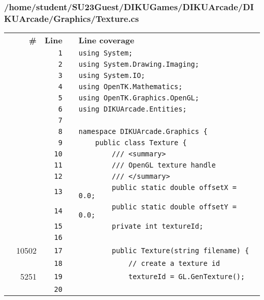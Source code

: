 \documentclass[a4paper,landscape,10pt]{article}
\begin{document}
\subsubsection{/home/student/SU23Guest/DIKUGames/DIKUArcade/DIKUArcade/Graphics/Texture.cs}
\begin{longtable}[l]{lrrll}
\textbf{} & \textbf{\#} & \textbf{Line} & \textbf{} & \textbf{Line coverage}\\
\cellcolor{gray} &  & \verb~1~ & & \verb~using System;~\\
\cellcolor{gray} &  & \verb~2~ & & \verb~using System.Drawing.Imaging;~\\
\cellcolor{gray} &  & \verb~3~ & & \verb~using System.IO;~\\
\cellcolor{gray} &  & \verb~4~ & & \verb~using OpenTK.Mathematics;~\\
\cellcolor{gray} &  & \verb~5~ & & \verb~using OpenTK.Graphics.OpenGL;~\\
\cellcolor{gray} &  & \verb~6~ & & \verb~using DIKUArcade.Entities;~\\
\cellcolor{gray} &  & \verb~7~ & & \verb~~\\
\cellcolor{gray} &  & \verb~8~ & & \verb~namespace DIKUArcade.Graphics {~\\
\cellcolor{gray} &  & \verb~9~ & & \verb~    public class Texture {~\\
\cellcolor{gray} &  & \verb~10~ & & \verb~        /// <summary>~\\
\cellcolor{gray} &  & \verb~11~ & & \verb~        /// OpenGL texture handle~\\
\cellcolor{gray} &  & \verb~12~ & & \verb~        /// </summary>~\\
\cellcolor{gray} &  & \verb~13~ & & \verb~        public static double offsetX = 0.0;~\\
\cellcolor{gray} &  & \verb~14~ & & \verb~        public static double offsetY = 0.0;~\\
\cellcolor{gray} &  & \verb~15~ & & \verb~        private int textureId;~\\
\cellcolor{gray} &  & \verb~16~ & & \verb~~\\
\cellcolor{green} & 10502 & \verb~17~ & & \verb~        public Texture(string filename) {~\\
\cellcolor{gray} &  & \verb~18~ & & \verb~            // create a texture id~\\
\cellcolor{green} & 5251 & \verb~19~ & & \verb~            textureId = GL.GenTexture();~\\
\cellcolor{gray} &  & \verb~20~ & & \verb~~\\

\end{longtable}
\end{document}
